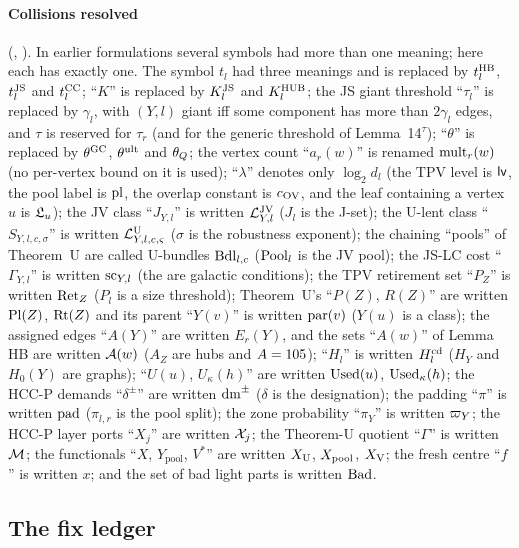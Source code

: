 \paragraph{Collisions resolved} (, ). In earlier formulations
several symbols had more than one meaning; here each has exactly one. The symbol
$t_l$ had three meanings and is replaced by $t^{\mathrm{HB}}_l$, $t^{\mathrm{JS}}_l$ and $t^{\mathrm{CC}}_l$; ``$K$''
is replaced by $K^{\mathrm{JS}}_l$ and $K^{\mathrm{HUB}}_l$; the JS giant threshold ``$\tau_l$'' is
replaced by $\gamma_l$, with $(Y,l)$ giant iff some component has more than
$2\gamma_l$ edges, and $\tau$ is reserved for $\tau_r$ (and for the generic
threshold of Lemma~14$^\tau$); ``$\theta$'' is replaced by $\theta^{\mathrm{GC}}$, $\theta^{\mathrm{ult}}$ and
$\theta_{Q}$; the vertex count ``$a_r(w)$'' is renamed $\mathrm{mult}_r(w)$ (no per-vertex
bound on it is used); ``$\lambda$'' denotes only $\log_2d_l$ (the TPV level is
$\mathsf{lv}$, the pool label is $\mathrm{pl}$, the overlap constant is $c_{\mathrm{OV}}$, and the leaf
containing a vertex $u$ is $\mathfrak{L}_u$); the JV class ``$J_{Y,l}$'' is written
$\mathcal{L}^{\mathrm{JV}}_{Y,l}$ ($J_l$ is the J-set); the U-lent class ``$S_{Y,l,c,\sigma}$'' is
written $\mathcal{L}^{\mathrm{U}}_{Y,l,c,\varsigma}$ ($\sigma$ is the robustness exponent); the chaining
``pools'' of Theorem~U are called U-bundles $\mathrm{Bdl}_{l,c}$ ($\mathrm{Pool}_l$ is the JV
pool); the JS-LC cost ``$\Gamma_{Y,l}$'' is written $\mathrm{sc}_{Y,l}$ (the
 are galactic conditions); the TPV retirement set ``$P_Z$'' is written
$\mathrm{Ret}_Z$ ($P_l$ is a size threshold); Theorem~U's ``$P(Z)$, $R(Z)$'' are written
$\mathrm{Pl}(Z)$, $\mathrm{Rt}(Z)$ and its parent ``$Y(v)$'' is written $\mathrm{par}(v)$ ($Y(u)$ is a
class); the assigned edges ``$A(Y)$'' are written $E_r(Y)$, and the sets
``$A(w)$'' of Lemma HB are written $\mathcal{A}(w)$ ($A_Z$ are hubs and $A=105$);
``$H_l$'' is written $H^{\mathrm{cd}}_l$ ($H_Y$ and $H_0(Y)$ are graphs); ``$U(u)$,
$U_\kappa(h)$'' are written $\mathrm{Used}(u)$, $\mathrm{Used}_\kappa(h)$; the HCC-P demands
``$\delta^\pm$'' are written $\mathrm{dm}^\pm$ ($\delta$ is the designation); the padding
``$\pi$'' is written $\mathrm{pad}$ ($\pi_{l,r}$ is the pool split); the zone probability
``$\pi_Y$'' is written $\varpi_Y$; the HCC-P layer ports ``$X_j$'' are written
$\mathcal{X}_j$; the Theorem-U quotient ``$\Gamma$'' is written $\mathcal{M}$; the functionals
``$X$, $Y_{\mathrm{pool}}$, $V^*$'' are written $X_{\mathrm{U}}$, $X_{\mathrm{pool}}$, $X_{\mathrm{V}}$; the fresh
centre ``$f$'' is written $x$; and the set of bad light parts is written $\mathrm{Bad}$.

\subsection{The fix ledger}\label{s1:ssecFixes}

